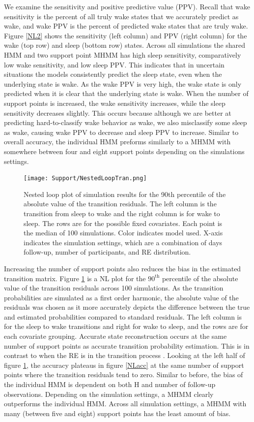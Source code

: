 \documentclass{article}
\begin{document}
We examine the sensitivity and positive predictive value (PPV). Recall that wake sensitivity is the percent of all truly wake states that we accurately predict as wake, and wake PPV is the percent of predicted wake states that are truly wake. Figure \ref{NL2} shows the sensitivity (left column) and PPV (right column) for the wake (top row) and sleep (bottom row) states. Across all simulations the shared HMM and two support point MHMM has high sleep sensitivity, comparatively low wake sensitivity, and low sleep PPV. This indicates that in uncertain situations the models consistently predict the sleep state, even when the underlying state is wake. As the wake PPV is very high, the wake state is only predicted when it is clear that the underlying state is wake. When the number of support points is increased, the wake sensitivity increases, while the sleep sensitivity decreases slightly. This occurs because although we are better at predicting hard-to-classify wake behavior as wake, we also misclassify some sleep as wake, causing wake PPV to decrease and sleep PPV to increase. Similar to overall accuracy, the individual HMM preforms similarly to a MHMM with somewhere between four and eight support points depending on the simulations settings.

\begin{figure}
    \texttt{[image: Support/NestedLoopTran.png]}
    \centering
    \caption{Nested loop plot of simulation results for the 90th percentile of the absolute value of the transition residuals. The left column is the transition from sleep to wake and the right column is for wake to sleep. The rows are for the possible fixed covariates. Each point is the median of 100 simulations. Color indicates model used. X-axis indicates the simulation settings, which are a combination of days follow-up, number of participants, and RE distribution.}
    \label{NLtran}
\end{figure}

Increasing the number of support points also reduces the bias in the estimated transition matrix. Figure \ref{NLtran} is a NL plot for the $90^{\text{th}}$ percentile of the absolute value of the transition residuals across 100 simulations. As the transition probabilities are simulated as a first order harmonic, the absolute value of the residuals was chosen as it more accurately depicts the difference between the true and estimated probabilities compared to standard residuals. The left column is for the sleep to wake transitions and right for wake to sleep, and the rows are for each covariate grouping. Accurate state reconstruction occurs at the same number of support points as accurate transition probability estimation. This is in contrast to when the RE is in the transition process \cite{mcclintock2021}. Looking at the left half of figure \ref{NLtran}, the accuracy plateaus in figure \ref{NLacc} at the same number of support points where the transition residuals tend to zero. Similar to before, the bias of the individual HMM is dependent on both H and number of follow-up observations. Depending on the simulation settings, a MHMM clearly outperforms the individual HMM. Across all simulation settings, a MHMM with many (between five and eight) support points has the least amount of bias.
\end{document}
